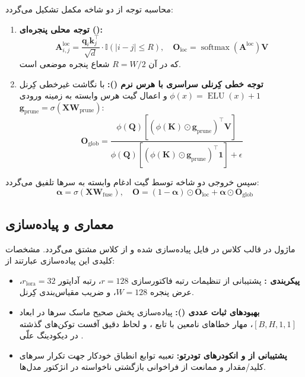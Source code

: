 محاسبه توجه از دو شاخه مکمل تشکیل می‌گردد:
\begin{enumerate}
    \item \textbf{توجه محلی پنجره‌ای ():}
    \begin{equation}
    \mathbf{A}_{i,j}^{\text{loc}} = \frac{\mathbf{q}_i \mathbf{k}_j^\top}{\sqrt{d}} \cdot \mathbb{I}(|i - j| \le R), \quad \mathbf{O}_{\text{loc}} = \operatorname{softmax}\left(\mathbf{A}^{\text{loc}}\right) \mathbf{V}
    \end{equation}
    که در آن $R = W / 2$ شعاع پنجره موضعی است.
    \item \textbf{توجه خطی کِرنلی سراسری با هرس نرم ():} با نگاشت غیرخطی کِرنل $\phi(x) = \operatorname{ELU}(x) + 1$ و اعمال گیت هرس وابسته به زمینه ورودی $\mathbf{g}_{\text{prune}} = \sigma(\mathbf{X} \mathbf{W}_{\text{prune}})$:
    \begin{equation}
    \mathbf{O}_{\text{glob}} = \frac{\phi(\mathbf{Q}) \left[ (\phi(\mathbf{K}) \odot \mathbf{g}_{\text{prune}})^\top \mathbf{V} \right]}{\phi(\mathbf{Q}) \left[ (\phi(\mathbf{K}) \odot \mathbf{g}_{\text{prune}})^\top \mathbf{1} \right] + \epsilon}
    \end{equation}
\end{enumerate}
سپس خروجی دو شاخه توسط گیت ادغام وابسته به سرها تلفیق می‌گردد:
\begin{equation}
\boldsymbol{\alpha} = \sigma(\mathbf{X} \mathbf{W}_{\text{fuse}}), \quad \mathbf{O} = (1 - \boldsymbol{\alpha}) \odot \mathbf{O}_{\text{loc}} + \boldsymbol{\alpha} \odot \mathbf{O}_{\text{glob}}
\end{equation}

\subsection{معماری و پیاده‌سازی}
ماژول در قالب کلاس  در فایل  پیاده‌سازی شده و از کلاس  مشتق می‌گردد. مشخصات کلیدی این پیاده‌سازی عبارتند از:
\begin{itemize}
    \item \textbf{پیکربندی :} پشتیبانی از تنظیمات رتبه فاکتورسازی $r=128$، رتبه آداپتور $r_{\text{lora}}=32$، عرض پنجره $W=128$، و ضریب مقیاس‌بندی کِرنل.
    \item \textbf{بهبودهای ثبات عددی ():} پیاده‌سازی پخش صحیح ماسک سرها در ابعاد $[B, H, 1, 1]$، مهار خطاهای نامعین با تابع ، و لحاظ دقیق آفست توکن‌های گذشته در دیکودینگ علّی .
    \item \textbf{پشتیبانی از  و انکودرهای تودرتو:} تعبیه توابع انطباق خودکار جهت تکرار سرهای کلید/مقدار و ممانعت از فراخوانی بازگشتی ناخواسته در انژکتور مدل‌ها.
\end{itemize}

